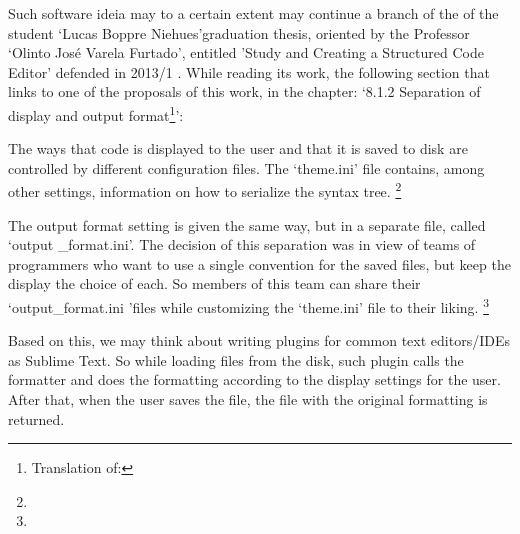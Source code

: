 Such software ideia may to a certain extent may continue a branch of the of
the student `Lucas Boppre Niehues'\s graduation thesis, oriented by the
Professor `Olinto José Varela Furtado', entitled 'Study and Creating a
Structured Code Editor' defended in 2013/1 \cite{structuredEditorStudy}.
While reading its work, the following section that links to one of the
proposals of this work, in the chapter: `8.1.2 Separation of display and
output format\footnote{Translation of: }':

\begin{citacao}
The ways that code is displayed to the user and that it is saved to disk are
controlled by different configuration files. The `theme.ini' file contains,
among other settings, information on how to serialize the syntax tree.
\cite[our translation]{structuredEditorStudy} \footnote{}
\end{citacao}
\begin{citacao}
The output format setting is given the same way, but in a separate file,
called `output \_format.ini'. The decision of this separation was in view of
teams of programmers who want to use a single convention for the saved
files, but keep the display the choice of each. So members of this team can
share their `output\_format.ini 'files while customizing the `theme.ini'
file to their liking. \cite[our translation]{structuredEditorStudy}
\footnote{}
\end{citacao}

Based on this, we may think about writing plugins for common text
editors/IDEs as Sublime Text. So while loading files from the disk, such
plugin calls the formatter and does the formatting according to the display
settings for the user. After that, when the user saves the file, the file
with the original formatting is returned.

